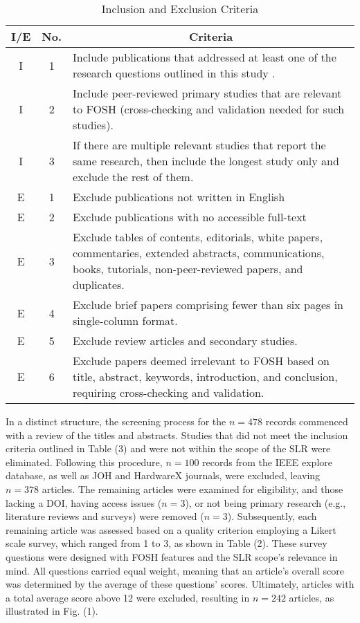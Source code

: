 \begin{table}[htbp]
\centering
\caption{Inclusion and Exclusion Criteria}
\begin{tabular}{|c|c|p{6.5cm}|}
\hline
\textbf{I/E} & \textbf{No.} & \multicolumn{1}{c|}{\textbf{Criteria}} \\
\hline
I & 1 & Include publications that addressed at least one of the research questions outlined in this study . \\
\hline
I & 2 & Include peer-reviewed primary studies that are relevant to FOSH (cross-checking and validation needed for such studies). \\
\hline
I & 3 & If there are multiple relevant studies that report the same research, then include the longest study only and exclude the rest of them. \\
\hline
E & 1 & Exclude publications not written in English \\
\hline
E & 2 & Exclude publications with no accessible full-text\\
\hline
E & 3 & Exclude tables of contents, editorials, white papers, commentaries, extended abstracts, communications, books, tutorials, non-peer-reviewed papers, and duplicates. \\
\hline
E & 4 & Exclude brief papers comprising fewer than six pages in single-column format. \\
\hline
E & 5 & Exclude review articles and secondary studies. \\
\hline
E & 6 & Exclude papers deemed irrelevant to FOSH based on title, abstract, keywords, introduction, and conclusion, requiring cross-checking and validation. \\
\hline
\end{tabular}
\label{tab:criteria}
\end{table}

In a distinct structure, the screening process for the $n=478$ records commenced with a review of the titles and abstracts. Studies that did not meet the inclusion criteria outlined in Table (3) and were not within the scope of the SLR were eliminated. Following this procedure, $n=100$ records from the IEEE explore database, as well as JOH and HardwareX journals, were excluded, leaving $n=378$ articles. The remaining articles were examined for eligibility, and those lacking a DOI, having access issues ($n=3$), or not being primary research (e.g., literature reviews and surveys) were removed ($n=3$). Subsequently, each remaining article was assessed based on a quality criterion employing a Likert scale survey, which ranged from 1 to 3, as shown in Table (2). These survey questions were designed with FOSH features and the SLR scope's relevance in mind. All questions carried equal weight, meaning that an article's overall score was determined by the average of these questions' scores. Ultimately, articles with a total average score above 12 were excluded, resulting in $n=242$ articles, as illustrated in Fig. (1).

